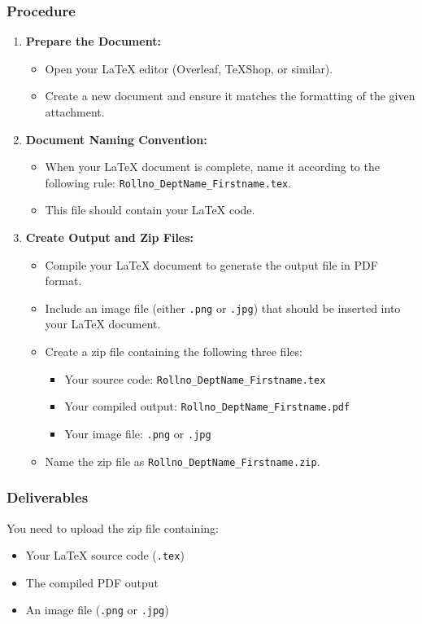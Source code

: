 \documentclass[a4paper,12pt]{article}
\begin{document}
\subsubsection*{Procedure}
\begin{enumerate}[label=\arabic*.]
    \item \textbf{Prepare the Document:}
    \begin{itemize}
        \item Open your LaTeX editor (Overleaf, TeXShop, or similar).
        \item Create a new document and ensure it matches the formatting of the given attachment.
    \end{itemize}
    
    \item \textbf{Document Naming Convention:}
    \begin{itemize}
        \item When your LaTeX document is complete, name it according to the following rule: \texttt{Rollno\_DeptName\_Firstname.tex}.
        \item This file should contain your LaTeX code.
    \end{itemize}
    
    \item \textbf{Create Output and Zip Files:}
    \begin{itemize}
        \item Compile your LaTeX document to generate the output file in PDF format.
        \item Include an image file (either \texttt{.png} or \texttt{.jpg}) that should be inserted into your LaTeX document.
        \item Create a zip file containing the following three files:
        \begin{itemize}
            \item Your source code: \texttt{Rollno\_DeptName\_Firstname.tex}
            \item Your compiled output: \texttt{Rollno\_DeptName\_Firstname.pdf}
            \item Your image file: \texttt{.png} or \texttt{.jpg}
        \end{itemize}
        \item Name the zip file as \texttt{Rollno\_DeptName\_Firstname.zip}.
    \end{itemize}
\end{enumerate}

\subsubsection*{Deliverables}
You need to upload the zip file containing:
\begin{itemize}
    \item Your LaTeX source code (\texttt{.tex})
    \item The compiled PDF output
    \item An image file (\texttt{.png} or \texttt{.jpg})
\end{itemize}
\newpage
\end{document}
